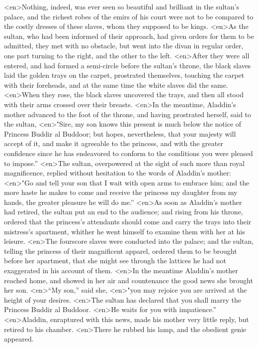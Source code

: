 <en>Nothing, indeed, was ever seen so beautiful and brilliant in the sultan’s palace, and the richest robes of the emirs of his court were not to be compared to the costly dresses of these slaves, whom they supposed to be kings.
<en>As the sultan, who had been informed of their approach, had given orders for them to be admitted, they met with no obstacle, but went into the divan in regular order, one part turning to the right, and the other to the left.
<en>After they were all entered, and had formed a semi-circle before the sultan’s throne, the black slaves laid the golden trays on the carpet, prostrated themselves, touching the carpet with their foreheads, and at the same time the white slaves did the same.
<en>When they rose, the black slaves uncovered the trays, and then all stood with their arms crossed over their breasts.
<en>In the meantime, Aladdin’s mother advanced to the foot of the throne, and having prostrated herself, said to the sultan,
<en>"Sire, my son knows this present is much below the notice of Princess Buddir al Buddoor; but hopes, nevertheless, that your majesty will accept of it, and make it agreeable to the princess, and with the greater confidence since he has endeavored to conform to the conditions you were pleased to impose.”
<en>The sultan, overpowered at the sight of such more than royal magnificence, replied without hesitation to the words of Aladdin’s mother:
<en>"Go and tell your son that I wait with open arms to embrace him; and the more haste he makes to come and receive the princess my daughter from my hands, the greater pleasure he will do me.”
<en>As soon as Aladdin’s mother had retired, the sultan put an end to the audience; and rising from his throne, ordered that the princess’s attendants should come and carry the trays into their mistress’s apartment, whither he went himself to examine them with her at his leisure.
<en>The fourscore slaves were conducted into the palace; and the sultan, telling the princess of their magnificent apparel, ordered them to be brought before her apartment, that she might see through the lattices he had not exaggerated in his account of them.
<en>In the meantime Aladdin’s mother reached home, and showed in her air and countenance the good news she brought her son.
<en>“My son,” said she,
<en>"you may rejoice you are arrived at the height of your desires.
<en>The sultan has declared that you shall marry the Princess Buddir al Buddoor.
<en>He waits for you with impatience.”
<en>Aladdin, enraptured with this news, made his mother very little reply, but retired to his chamber.
<en>There he rubbed his lamp, and the obedient genie appeared.
